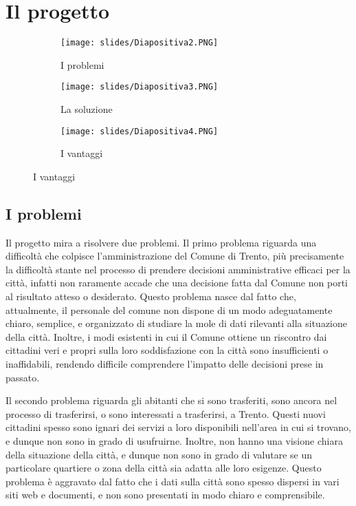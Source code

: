 \chapter{Il progetto \ProjectTitle}
\begin{figure}[H]
    \begin{subfigure}{0.33\textwidth}
        \texttt{[image: slides/Diapositiva2.PNG]}
        \caption{I problemi}
    \end{subfigure}
    \begin{subfigure}{0.33\textwidth}
        \texttt{[image: slides/Diapositiva3.PNG]}
        \caption{La soluzione}
    \end{subfigure}
    \begin{subfigure}{0.33\textwidth}
        \texttt{[image: slides/Diapositiva4.PNG]}
        \caption{I vantaggi}
    \end{subfigure}
\end{figure}

\section{I problemi}
    Il progetto mira a risolvere due problemi. Il primo problema riguarda una difficoltà che colpisce l'amministrazione del Comune di Trento, più precisamente la difficoltà stante nel processo di prendere decisioni amministrative efficaci per la città, infatti non raramente accade che una decisione fatta dal Comune non porti al risultato atteso o desiderato. Questo problema nasce dal fatto che, attualmente, il personale del comune non dispone di un modo adeguatamente chiaro, semplice, e organizzato di studiare la mole di dati rilevanti alla situazione della città. Inoltre, i modi esistenti in cui il Comune ottiene un riscontro dai cittadini veri e propri sulla loro soddisfazione con la città sono insufficienti o inaffidabili, rendendo difficile comprendere l'impatto delle decisioni prese in passato. 
    
    Il secondo problema riguarda gli abitanti che si sono trasferiti, sono ancora nel processo di trasferirsi, o sono interessati a trasferirsi, a Trento. Questi nuovi cittadini spesso sono ignari dei servizi a loro disponibili nell'area in cui si trovano, e dunque non sono in grado di usufruirne. Inoltre, non hanno una visione chiara della situazione della città, e dunque non sono in grado di valutare se un particolare quartiere o zona della città sia adatta alle loro esigenze. Questo problema è aggravato dal fatto che i dati sulla città sono spesso dispersi in vari siti web e documenti, e non sono presentati in modo chiaro e comprensibile.

